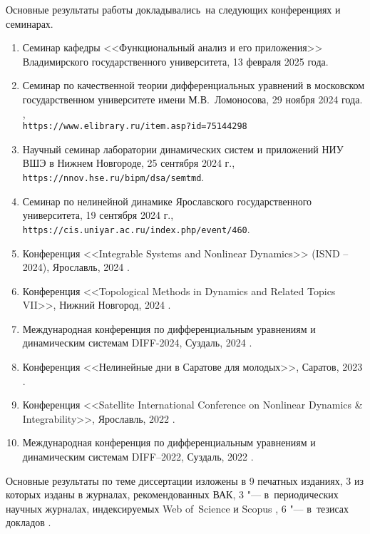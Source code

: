 {\probation}
Основные результаты работы докладывались~на следующих конференциях и семинарах.
\begin{enumerate}
	\item Семинар кафедры <<Функциональный анализ и его приложения>> Владимирского государственного университета, 13 февраля 2025 года.
	\item Семинар по качественной теории дифференциальных уравнений в московском государственном университете имени М.В.~Ломоносова, 29 ноября 2024 года. \cite{Sergeev2024},\\\texttt{https://www.elibrary.ru/item.asp?id=75144298}
	\item Научный семинар лаборатории динамических систем и приложений НИУ ВШЭ в Нижнем Новгороде, 25 сентября 2024 г.,\\\texttt{https://nnov.hse.ru/bipm/dsa/semtmd}.
	\item Семинар по нелинейной динамике Ярославского государственного университета, 19 сентября 2024 г.,\\\texttt{https://cis.uniyar.ac.ru/index.php/event/460}.
	\item Конференция <<Integrable Systems and Nonlinear Dynamics>> (ISND – 2024), Ярославль, 2024 \cite{confbib5}.
	\item Конференция <<Topological Methods in Dynamics and Related Topics VII>>, Нижний Новгород, 2024 \cite{confbib6}.
	\item Международная конференция по дифференциальным уравнениям и динамическим системам DIFF-2024, Суздаль, 2024 \cite{confbib3}.
	\item Конференция <<Нелинейные дни в Саратове для молодых>>, Саратов, 2023 \cite{confbib2}.
	\item Конференция <<Satellite International Conference on Nonlinear Dynamics {\&} Integrability>>, Ярославль, 2022 \cite{confbib4}.
	\item Международная конференция по дифференциальным уравнениям и динамическим системам DIFF--2022, Суздаль, 2022 \cite{confbib1}.
\end{enumerate}



{\publications} Основные результаты по теме диссертации изложены в 9 печатных изданиях, 3 из которых \cite{wosbib1,wosbib2,scbib1} изданы в журналах, рекомендованных ВАК, 3 "--- в~периодических научных журналах, индексируемых Web of~Science и Scopus \cite{wosbib1,wosbib2,scbib1}, 6 "--- в~тезисах докладов \cite{confbib1,confbib2,confbib3,confbib4,confbib5,confbib6}.

